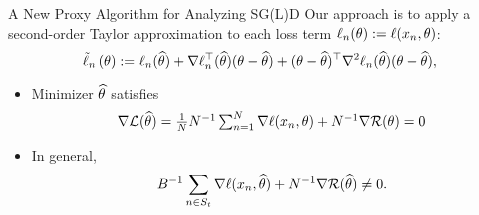 \documentclass[10pt,xcolor=table]{beamer}
\begin{document}
\begin{frame}{A New Proxy Algorithm for Analyzing SG(L)D}
Our approach is to apply a second-order Taylor approximation to each loss term $\ell_{n}(\theta) := \ell(x_{n}, \theta)$:
\begin{equation*}
	\tilde\ell_{n}\left(\theta\right)  := \ell_{n}(\widehat{\theta}) + \nabla \ell_{n}^{\top}( \widehat{\theta}) (\theta-\widehat{\theta})+ (\theta-\widehat{\theta})^{\top}\nabla^{2} \ell_{n}(\widehat{\theta}) (\theta-\widehat{\theta}),
	\label{eq: proxy algorithm framework for general loss}
\end{equation*}\pause

\begin{itemize}
	\item Minimizer $\widehat{\theta}$ satisfies 
	$$
	\nabla\textstyle\mathcal{L}(\widehat{\theta}) = \frac{1}{N} N^{-1} \sum_{n =1}^{N} \nabla \ell(x_{n}, \theta) + N^{-1} \nabla \mathcal{R}(\theta) = 0
	$$
	\item In general, 
	$$
	B^{-1} \sum_{n \in S_{t}} \nabla \ell(x_{n}, \widehat{\theta}) + N^{-1} \nabla \mathcal{R}(\widehat{\theta}) \neq 0.
	$$
\end{itemize}
\end{frame}
\end{document}
